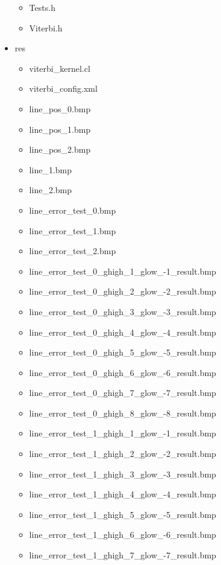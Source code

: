 \documentclass[document.tex]{subfiles}
\begin{document}
\begin{itemize}
\begin{itemize}
        \item Tests.h
        \item Viterbi.h
    \end{itemize}
    \clearpage
    \item res
    \begin{itemize}
        \item viterbi\_kernel.cl
        \item viterbi\_config.xml
        \item line\_pos\_0.bmp
        \item line\_pos\_1.bmp
        \item line\_pos\_2.bmp
        \item line\_1.bmp
        \item line\_2.bmp
        \item line\_error\_test\_0.bmp
        \item line\_error\_test\_1.bmp
        \item line\_error\_test\_2.bmp
        \item line\_error\_test\_0\_ghigh\_1\_glow\_-1\_result.bmp
        \item line\_error\_test\_0\_ghigh\_2\_glow\_-2\_result.bmp
        \item line\_error\_test\_0\_ghigh\_3\_glow\_-3\_result.bmp
        \item line\_error\_test\_0\_ghigh\_4\_glow\_-4\_result.bmp
        \item line\_error\_test\_0\_ghigh\_5\_glow\_-5\_result.bmp
        \item line\_error\_test\_0\_ghigh\_6\_glow\_-6\_result.bmp
        \item line\_error\_test\_0\_ghigh\_7\_glow\_-7\_result.bmp
        \item line\_error\_test\_0\_ghigh\_8\_glow\_-8\_result.bmp
        \item line\_error\_test\_1\_ghigh\_1\_glow\_-1\_result.bmp
        \item line\_error\_test\_1\_ghigh\_2\_glow\_-2\_result.bmp
        \item line\_error\_test\_1\_ghigh\_3\_glow\_-3\_result.bmp
        \item line\_error\_test\_1\_ghigh\_4\_glow\_-4\_result.bmp
        \item line\_error\_test\_1\_ghigh\_5\_glow\_-5\_result.bmp
        \item line\_error\_test\_1\_ghigh\_6\_glow\_-6\_result.bmp
        \item line\_error\_test\_1\_ghigh\_7\_glow\_-7\_result.bmp

\end{itemize}
\end{itemize}
\end{document}
